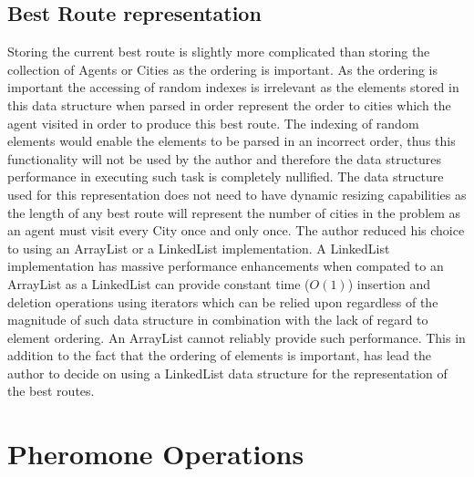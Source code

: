 \subsection{Best Route representation}
\label{bestrtoutey}
Storing the current best route is slightly more complicated than storing the collection of Agents or Cities as the ordering is important. As the ordering is important the accessing of random indexes is irrelevant as the elements stored in this data structure when parsed in order represent the order to cities which the agent visited in order to produce this best route. The indexing of random elements would enable the elements to be parsed in an incorrect order, thus this functionality will not be used by the author and therefore the data structures performance in executing such task is completely nullified. The data structure used for this representation does not need to have dynamic resizing capabilities as the length of any best route will represent the number of cities in the problem as an agent must visit every City once and only once. The author reduced his choice to using an ArrayList or a LinkedList implementation. A LinkedList implementation has massive performance enhancements when compated to an ArrayList as a LinkedList can provide constant time ($O(1)$) insertion and deletion operations using iterators which can be relied upon regardless of the magnitude of such data structure in combination with the lack of regard to element ordering. An ArrayList cannot reliably provide such performance. This in addition to the fact that the ordering of elements is important, has lead the author to decide on using a LinkedList data structure for the representation of the best routes.

\section{Pheromone Operations}

